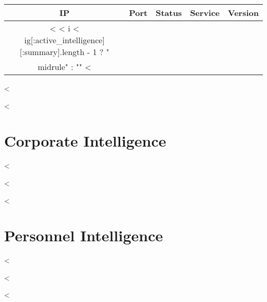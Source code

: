       \begin{center}
        \begin{tabularx}{\textwidth}{c c c c X}
          \toprule
          \textbf{IP} & \textbf{Port} & \textbf{Status} & \textbf{Service} & \textbf{Version} \\ \midrule
          <%
            <%
              i < ig[:active_intelligence][:summary].length - 1 ?
              "\\midrule" :
              ""
          <%
          \bottomrule
        \end{tabularx}
      \end{center}

  <%

  <%

  \section {Corporate Intelligence}\label{sec:corporateint}

    <%

  <%

  <%

  \section {Personnel Intelligence}\label{sec:personnelint}

    <%

  <%


<%
